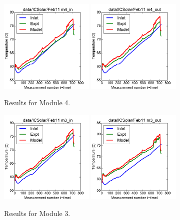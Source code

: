 \documentclass{article}
\begin{document}
\clearpage
\begin{figure}[!ht]
\centering
\includegraphics[width=0.4\textwidth]{../../data/ICSolar/images/Feb11_m4_in.pdf}\hspace{0.05\textwidth}
\includegraphics[width=0.4\textwidth]{../../data/ICSolar/images/Feb11_m4_out.pdf}\hspace{0.05\textwidth}\\
\caption{Results for Module 4.}\end{figure}
\begin{figure}[!ht]
\centering
\includegraphics[width=0.4\textwidth]{../../data/ICSolar/images/Feb11_m3_in.pdf}\hspace{0.05\textwidth}
\includegraphics[width=0.4\textwidth]{../../data/ICSolar/images/Feb11_m3_out.pdf}\hspace{0.05\textwidth}\\
\caption{Results for Module 3.}\end{figure}
\end{document}

